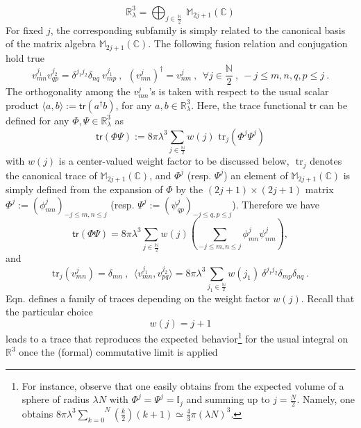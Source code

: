 \documentclass[10pt]{book}
\newcommand{\tr}{\mathsf{tr}}
\theoremstyle{break}
\begin{document}
%
\begin{equation*}
\mathbb{R}^3_\lambda = \bigoplus_{j\in\frac{\mathbb{N}}{2}} \ \mathbb{M}_{2j+1}(\mathbb{C})%
\end{equation*}
%
For fixed $j$, the corresponding subfamily is simply related to the canonical basis of the matrix algebra $\mathbb{M}_{2j+1}(\mathbb{C})$. The following fusion relation and conjugation hold true%
%
\begin{equation*}
v^{j_1}_{mn} v^{j_2}_{qp} = \delta^{j_1j_2} \delta_{nq} \ v^{j_1}_{mp} \ , \ \ (v^j_{mn})^\dag=v^j_{nm} \ , \ \ 
\forall j\in\frac{\mathbb{N}}{2} \ , \ -j\le m,n,q,p\le j \ . %
\end{equation*}
%
The orthogonality among the $v^j_{mn}$'s is taken with respect to the usual scalar product $\langle a,b\rangle:=\tr(a^\dag b)$, for any $a,b\in\mathbb{R}^3_\lambda$. Here, the trace functional $\tr$ can be defined %
for any $\Phi,\Psi\in\mathbb{R}^3_\lambda$ as%
%
\begin{equation*}
\tr(\Phi\Psi) := 8 \pi \lambda^3 \sum_{j\in\frac{\mathbb{N}}{2}} w(j) \mbox{ tr}_j(\Phi^j\Psi^j)%
\end{equation*}
%
with $w(j)$ is a center-valued weight factor to be discussed below, $\mbox{ tr}_j$ denotes the canonical trace of $\mathbb{M}_{2j+1}(\mathbb{C})$, and $\Phi^j$ (resp. $\Psi^j$) an element of $\mathbb{M}_{2j+1}(\mathbb{C})$ is simply defined from the expansion %
of $\Phi$ by the $(2j+1)\times(2j+1)$ matrix $\Phi^j:=(\phi^j_{mn})_{-j\le m,n\le j}$ (resp. $\Psi^j:= (\psi^j_{qp})_{-j\le q,p\le j}$). Therefore we have%
%
\begin{equation*}
\tr(\Phi\Psi)  = 8 \pi \lambda^3 \sum_{j\in\frac{\mathbb{N}}{2}} w(j) \left( \sum_{-j\le m,n\le j}\phi^j_{mn}\psi^j_{nm}\right), %
\end{equation*}
%
and%
%
\begin{equation*}
\mbox{tr}_j(v^j_{mn}) = \delta_{mn} \ , \ \
\langle v^{j_1}_{mn} , v^{j_2}_{pq} \rangle = 8 \pi \lambda^3 \sum_{j_1\in\frac{\mathbb{N}}{2}} w(j_1) \ \delta^{j_1j_2} \delta_{mp} \delta_{nq} \ . %
\end{equation*}
%
Eqn. %
defines a family of traces depending on the weight factor $w(j)$. Recall that the particular choice%
\begin{equation*}
w(j)=j+1%
\end{equation*}
%
leads to a trace that reproduces the expected behavior{\footnote{For instance, observe that one easily obtains from %
the expected volume of a sphere of radius $\lambda N$ with $\Phi^j=\Psi^j= \mathbb{I}_j$ and summing up to $j=\frac{N}{2}$. Namely, one obtains $8\pi\lambda^3\overset{N}{\underset{k=0}{\sum}}\left(\frac{k}{2}\right)(k+1)\simeq\frac43\pi\left(\lambda N\right)^3$.}} for the usual integral on $\mathbb{R}^3$ once the (formal) commutative limit is applied %
\end{document}
